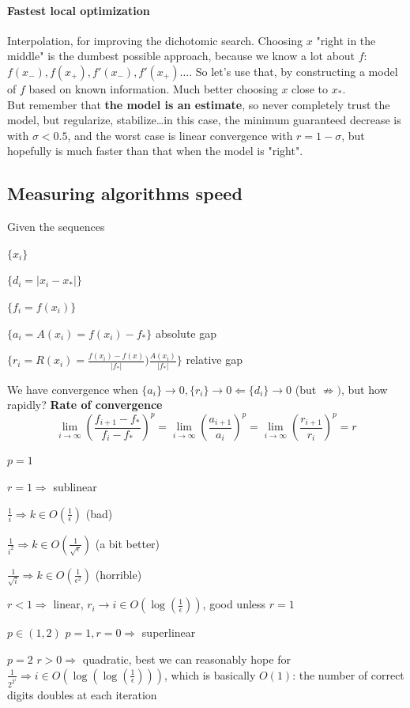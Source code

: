 \documentclass[10pt]{report}
\begin{document}
\paragraph{Fastest local optimization} Interpolation, for improving the dichotomic search. Choosing $x$ "right in the middle" is the dumbest possible approach, because we know a lot about $f$: $f(x_-), f(x_+), f'(x_-), f'(x_+)\ldots$. So let's use that, by constructing a model of $f$ based on known information. Much better choosing $x$ close to $x_*$.\\
But remember that \textbf{the model is an estimate}, so never completely trust the model, but regularize, stabilize\ldots in this case, the minimum guaranteed decrease is with $\sigma < 0.5$, and the worst case is linear convergence with $r = 1 - \sigma$, but hopefully is much faster than that when the model is "right".
\subsection{Measuring algorithms speed} Given the sequences \begin{list}{}{}
	\item $\{x_i\}$
	\item $\{d_i = |x_i - x_*|\}$
	\item $\{f_i = f(x_i)\}$
	\item $\{a_i = A(x_i) = f(x_i) - f_*\}$ absolute gap
	\item $\{r_i = R(x_i) = \frac{f(x_i) - f(x)}{|f_*|} ) \frac{A(x_i)}{|f_*|}\}$ relative gap
\end{list}
We have convergence when $\{a_i\} \rightarrow 0, \{r_i\} \rightarrow 0 \Leftarrow \{d_i\} \rightarrow 0$ (but $\not\Rightarrow)$, but how rapidly? \textbf{Rate of convergence}
$$\lim_{i\to\infty} \left(\frac{f_{i+1} - f_*}{f_i - f_*}\right)^p = \lim_{i\to\infty} \left(\frac{a_{i+1}}{a_i}\right)^p = \lim_{i\to\infty} \left(\frac{r_{i+1}}{r_i}\right)^p = r$$
\begin{list}{}{}
	\item[$p = 1$]\begin{list}{}{}
		\item $r = 1\Rightarrow$ sublinear \begin{list}{}{}
			\item $\frac{1}{i} \Rightarrow k \in O(\frac{1}{\epsilon})$ (bad)
			\item $\frac{1}{i^2} \Rightarrow k \in O(\frac{1}{\sqrt{\epsilon}})$ (a bit better)
			\item $\frac{1}{\sqrt{i}} \Rightarrow k \in O(\frac{1}{\epsilon^2})$ (horrible)
		\end{list}
		\item $r < 1\Rightarrow$ linear, $r_i \rightarrow i \in O(\log(\frac{1}{\epsilon}))$, good unless $r = 1$
	\end{list}
	\item[$p \in (1,2)$] $p = 1, r = 0\Rightarrow$ superlinear
	\item[$p = 2$] $r > 0\Rightarrow$ quadratic, best we can reasonably hope for\\
	$\frac{1}{2^{2^i}} \Rightarrow i \in O(\log(\log(\frac{1}{\epsilon})))$, which is basically $O(1)$: the number of correct digits doubles at each iteration
\end{list}
\end{document}
